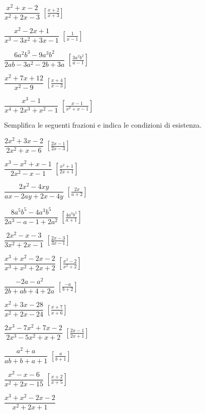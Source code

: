 \begin{esercizio}[\Ast]
\begin{multicols}{2}
\begin{enumeratea}
 \item $\dfrac{x^{2}+x-2}{x^{2}+2x-3}$
  \hfill $\left[\frac{x+2}{x+3}\right]$
 \item $\dfrac{x^{2}-2x+1}{x^{3}-3x^{2}+3x-1}$
  \hfill $\left[\frac{1}{x-1}\right]$
 \item $\dfrac{6a^{2}b^{3}-9a^{3}b^{2}}{2ab-3a^{2}-2b+3a}$
  \hfill $\left[\frac{3a^{2}b^{2}}{a-1}\right]$
 \item $\dfrac{x^{2}+7x+12}{x^{2}-9}$
  \hfill $\left[\frac{x+4}{x-3}\right]$
 \item $\dfrac{x^{3}-1}{x^{4}+2x^{3}+x^{2}-1}$
  \hfill $\left[\frac{x-1}{x^2+x-1}\right]$
\end{enumeratea}
\end{multicols}
\end{esercizio}

\begin{esercizio}[\Ast]
\label{ese:19.10}
Semplifica le seguenti frazioni e indica le condizioni di esistenza.
\begin{multicols}{2}
\begin{enumeratea}
 \item $\dfrac{2x^{2}+3x-2}{2x^{2}+x-6}$
  \hfill $\left[\frac{2x-1}{2x-3}\right]$
 \item $\dfrac{x^{3}-x^{2}+x-1}{2x^{2}-x-1}$
  \hfill $\left[\frac{x^2+1}{2x+1}\right]$
 \item $\dfrac{2x^{2}-4xy}{ax-2ay+2x-4y}$
  \hfill $\left[\frac{2x}{a+2}\right]$
 \item $\dfrac{8a^{5}b^{5}-4a^{3}b^{5}}{2a^{3}-a-1+2a^{2}}$
  \hfill $\left[\frac{4a^{3}b^{5}}{a+1}\right]$
 \item $\dfrac{2x^{2}-x-3}{3x^{2}+2x-1}$
  \hfill $\left[\frac{2x-3}{3x-1}\right]$
 \item $\dfrac{x^{3}+x^{2}-2x-2}{x^{3}+x^{2}+2x+2}$
  \hfill $\left[\frac{x^2-2}{x^2+2}\right]$
\newpage %
 \item $\dfrac{-2a-a^{2}}{2b+ab+4+2a}$
  \hfill $\left[\frac{-a}{b+2}\right]$
 \item $\dfrac{x^{2}+3x-28}{x^{2}+2x-24}$
  \hfill $\left[\frac{x+7}{x+6}\right]$
 \item $\dfrac{2x^{3}-7x^{2}+7x-2}{2x^{3}-5x^{2}+x+2}$
  \hfill $\left[\frac{2x-1}{2x+1}\right]$
 \item $\dfrac{a^{2}+a}{ab+b+a+1}$
  \hfill $\left[\frac{a}{b+1}\right]$
 \item $\dfrac{x^{2}-x-6}{x^{2}+2x-15}$
  \hfill $\left[\frac{x+2}{x+5}\right]$
 \item $\dfrac{x^{3}+x^{2}-2x-2}{x^{2}+2x+1}$

\end{enumeratea}
\end{multicols}
\end{esercizio}
